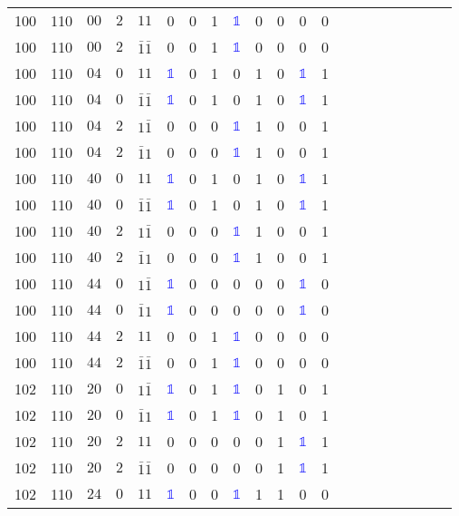 \begin{longtable*}{c| cccccccccccccccccccc }
100& 110& $00$& $2$& $11$& 0& 0& 1& \textcolor{blue}{$\mathds{1}$}& 0& 0& 0& 0\\
100& 110& $00$& $2$& $\bar{1}\bar{1}$& 0& 0& 1& \textcolor{blue}{$\mathds{1}$}& 0& 0& 0& 0\\
100& 110& $04$& $0$& $11$& \textcolor{blue}{$\mathds{1}$}& 0& 1& 0& 1& 0& \textcolor{blue}{$\mathds{1}$}& 1\\
100& 110& $04$& $0$& $\bar{1}\bar{1}$& \textcolor{blue}{$\mathds{1}$}& 0& 1& 0& 1& 0& \textcolor{blue}{$\mathds{1}$}& 1\\
100& 110& $04$& $2$& $1\bar{1}$& 0& 0& 0& \textcolor{blue}{$\mathds{1}$}& 1& 0& 0& 1\\
100& 110& $04$& $2$& $\bar{1}1$& 0& 0& 0& \textcolor{blue}{$\mathds{1}$}& 1& 0& 0& 1\\
100& 110& $40$& $0$& $11$& \textcolor{blue}{$\mathds{1}$}& 0& 1& 0& 1& 0& \textcolor{blue}{$\mathds{1}$}& 1\\
100& 110& $40$& $0$& $\bar{1}\bar{1}$& \textcolor{blue}{$\mathds{1}$}& 0& 1& 0& 1& 0& \textcolor{blue}{$\mathds{1}$}& 1\\
100& 110& $40$& $2$& $1\bar{1}$& 0& 0& 0& \textcolor{blue}{$\mathds{1}$}& 1& 0& 0& 1\\
100& 110& $40$& $2$& $\bar{1}1$& 0& 0& 0& \textcolor{blue}{$\mathds{1}$}& 1& 0& 0& 1\\
100& 110& $44$& $0$& $1\bar{1}$& \textcolor{blue}{$\mathds{1}$}& 0& 0& 0& 0& 0& \textcolor{blue}{$\mathds{1}$}& 0\\
100& 110& $44$& $0$& $\bar{1}1$& \textcolor{blue}{$\mathds{1}$}& 0& 0& 0& 0& 0& \textcolor{blue}{$\mathds{1}$}& 0\\
100& 110& $44$& $2$& $11$& 0& 0& 1& \textcolor{blue}{$\mathds{1}$}& 0& 0& 0& 0\\
100& 110& $44$& $2$& $\bar{1}\bar{1}$& 0& 0& 1& \textcolor{blue}{$\mathds{1}$}& 0& 0& 0& 0\\
102& 110& $20$& $0$& $1\bar{1}$& \textcolor{blue}{$\mathds{1}$}& 0& 1& \textcolor{blue}{$\mathds{1}$}& 0& 1& 0& 1\\
102& 110& $20$& $0$& $\bar{1}1$& \textcolor{blue}{$\mathds{1}$}& 0& 1& \textcolor{blue}{$\mathds{1}$}& 0& 1& 0& 1\\
102& 110& $20$& $2$& $11$& 0& 0& 0& 0& 0& 1& \textcolor{blue}{$\mathds{1}$}& 1\\
102& 110& $20$& $2$& $\bar{1}\bar{1}$& 0& 0& 0& 0& 0& 1& \textcolor{blue}{$\mathds{1}$}& 1\\
102& 110& $24$& $0$& $11$& \textcolor{blue}{$\mathds{1}$}& 0& 0& \textcolor{blue}{$\mathds{1}$}& 1& 1& 0& 0\\

\end{longtable*}
